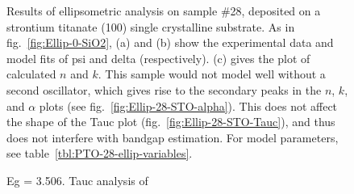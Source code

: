 \begin{figure}[htbp]
{	}
   \caption[Results of Ellipsometry on Sample \#28 on STO]%
   		{Results of ellipsometric analysis on sample \#28, deposited on a strontium titanate (100) single crystalline substrate. As in fig.~\ref{fig:Ellip-0-SiO2}, (a) and (b) show the experimental data and model fits of psi and delta (respectively). (c) gives the plot of calculated $n$ and $k$.  This sample would not model well without a second oscillator, which gives rise to the secondary peaks in the $n$, $k$, and $\alpha$ plots (see fig.~\vref{fig:Ellip-28-STO-alpha}). This does not affect the shape of the Tauc plot (fig.~\ref{fig:Ellip-28-STO-Tauc}), and thus does not interfere with bandgap estimation. For model parameters, see table~\vref{tbl:PTO-28-ellip-variables}.}
		\label{fig:Ellip-28-STO}
\end{figure}

\begin{figure}[htbp]
   \centering
   \hspace{0.5cm}
   \caption[Results of Tauc Analysis on Sample \#28 on STO]%
   		{Eg = 3.506. Tauc analysis of }\label{fig:Tauc-28-STO}
\end{figure}

